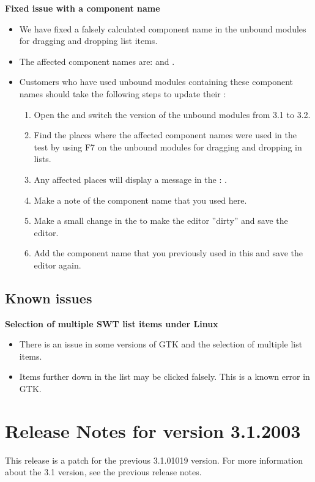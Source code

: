 \textbf{Fixed issue with a component name}
\begin{itemize}
\item We have fixed a falsely calculated component name in the unbound modules for dragging and dropping list items. 
\item The affected component names are:  and . 
\item Customers who have used unbound modules containing these component names should take the following steps to update their \gdprojects{}:
\begin{enumerate}
\item Open the \gdproject{} and switch the version of the unbound modules from 3.1 to 3.2. 
\item Find the places where the affected component names were used in the test by using F7 on the unbound modules for dragging and dropping in lists. 
\item Any affected places will display a message in the \gdcompnamesview{}: . 
\item Make a note of the component name that you used here. 
\item Make a small change in the \gdtestcaseeditor{} to make the editor ''dirty'' and save the editor. 
\item Add the component name that you previously used in this \gdcase{} and save the editor again. 
\end{enumerate}
\end{itemize}
\subsection{Known issues}
\textbf{Selection of multiple SWT list items under Linux}
\begin{itemize}
\item There is an issue in some versions of GTK and the selection of multiple list items.
\item Items further down in the list may be clicked falsely. This is a known error in GTK. 
\end{itemize}

\section{Release Notes for version 3.1.2003}
This release is a patch for the previous 3.1.01019 version. For more information about the 3.1 version, see the previous release notes. 
